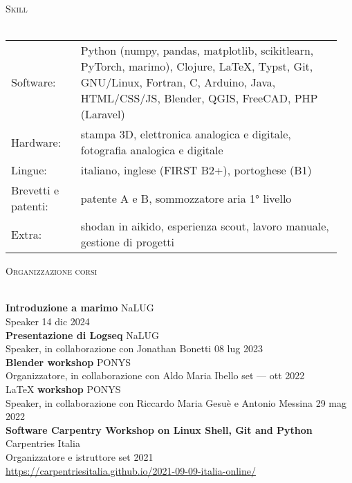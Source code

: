 \documentclass[a4paper]{article}
\newcommand{\lineunder} {
  \vspace*{-8pt} \\
  \hspace*{-18pt} \hrulefill \\
}
\newcommand{\header} [1] {
  {\hspace*{-18pt}\vspace*{6pt} \textsc{#1}}
  \vspace*{-6pt} \lineunder
}
\begin{document}
\header{Skill}
\vspace{1mm}

\begin{tabular}{ p{0.2\linewidth} p{0.75\linewidth} }
  Software: & Python (numpy, pandas, matplotlib, scikitlearn, PyTorch, marimo),
              Clojure, LaTeX, Typst, Git, GNU/Linux, Fortran,
              C, Arduino, Java, HTML/CSS/JS,
              Blender, QGIS, FreeCAD, PHP (Laravel) \\
  Hardware: & stampa 3D,
              elettronica analogica e digitale,
              fotografia analogica e digitale \\
  Lingue:   & italiano,
              inglese (FIRST B2+),
              portoghese (B1) \\
  Brevetti e patenti: & patente A e B,
                        sommozzatore aria 1° livello \\
  Extra: & shodan in aikido,
           esperienza scout,
           lavoro manuale,
           gestione di progetti
\end{tabular}
\vspace{2mm}

\header{Organizzazione corsi}
\vspace{1mm}

\textbf{Introduzione a marimo} \hfill NaLUG \\
Speaker \hfill 14 dic 2024 \\
\vspace*{2mm}
\textbf{Presentazione di Logseq} \hfill NaLUG \\
Speaker, in collaborazione con Jonathan Bonetti \hfill 08 lug 2023 \\
\vspace*{2mm}
\textbf{Blender workshop} \hfill PONYS \\
Organizzatore, in collaborazione con Aldo Maria Ibello \hfill set --- ott 2022 \\
\vspace*{2mm}
\LaTeX{} \textbf{workshop} \hfill PONYS \\
Speaker, in collaborazione con Riccardo Maria Gesuè e Antonio Messina \hfill 29 mag 2022 \\
\vspace*{2mm}
\textbf{Software Carpentry Workshop on Linux Shell, Git and Python} \hfill Carpentries Italia \\
Organizzatore e istruttore \hfill set 2021 \\
\url{https://carpentriesitalia.github.io/2021-09-09-italia-online/} \\
\vspace*{2mm}
\end{document}
